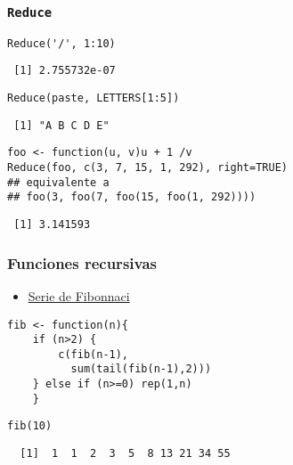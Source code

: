 \documentclass[xcolor={usenames,svgnames,dvipsnames}]{beamer}
\begin{document}
\begin{frame}[fragile]
\frametitle{\texttt{Reduce}}
\label{sec-4-4}


\lstset{language=R}
\begin{lstlisting}
Reduce('/', 1:10)
\end{lstlisting}

\begin{verbatim}
 [1] 2.755732e-07
\end{verbatim}


\lstset{language=R}
\begin{lstlisting}
Reduce(paste, LETTERS[1:5])
\end{lstlisting}

\begin{verbatim}
 [1] "A B C D E"
\end{verbatim}


\lstset{language=R}
\begin{lstlisting}
foo <- function(u, v)u + 1 /v
Reduce(foo, c(3, 7, 15, 1, 292), right=TRUE)
## equivalente a
## foo(3, foo(7, foo(15, foo(1, 292))))
\end{lstlisting}

\begin{verbatim}
 [1] 3.141593
\end{verbatim}
\end{frame}
\begin{frame}[fragile]
\frametitle{Funciones recursivas}
\label{sec-4-5}

\begin{itemize}
\item \href{http://en.wikibooks.org/wiki/R_Programming/Working_with_functions#Functions_as_Objects}{Serie de Fibonnaci}
\end{itemize}

\lstset{language=R}
\begin{lstlisting}
fib <- function(n){
    if (n>2) {
        c(fib(n-1),
          sum(tail(fib(n-1),2)))
    } else if (n>=0) rep(1,n)
    }
\end{lstlisting}



\lstset{language=R}
\begin{lstlisting}
fib(10)
\end{lstlisting}

\begin{verbatim}
  [1]  1  1  2  3  5  8 13 21 34 55
\end{verbatim}
\end{frame}
\end{document}
